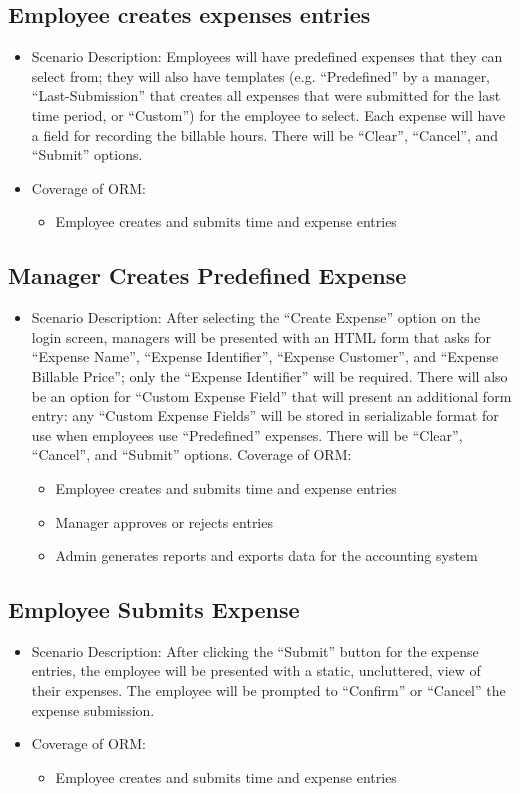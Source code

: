 \documentclass[12pt]{article}
\begin{document}
\subsection{ Employee creates expenses entries}
\begin{itemize}
\item Scenario Description: Employees will have predefined expenses that they can select from; they will also have templates (e.g. “Predefined” by a manager, “Last-Submission” that creates all expenses that were submitted for the last time period, or “Custom”) for the employee to select. Each expense will have a field for recording the billable hours. There will be “Clear”, “Cancel”, and “Submit” options.
\item Coverage of ORM:
\begin{itemize}
\item Employee creates and submits time and expense entries
\end{itemize}
\end{itemize}

\subsection{ Manager Creates Predefined Expense}
\begin{itemize}
\item Scenario Description: After selecting the “Create Expense” option on the login screen, managers will be presented with an HTML form that asks for “Expense Name”, “Expense Identifier”, “Expense Customer”, and “Expense Billable Price”; only the “Expense Identifier” will be required. There will also be an option for “Custom Expense Field” that will present an additional form entry: any “Custom Expense Fields” will be stored in serializable format for use when employees use “Predefined” expenses. There will be “Clear”, “Cancel”, and “Submit” options.
Coverage of ORM:
\begin{itemize}
\item Employee creates and submits time and expense entries
\item Manager approves or rejects entries
\item Admin generates reports and exports data for the accounting system
\end{itemize}
\end{itemize}

\subsection{ Employee Submits Expense}
\begin{itemize}
\item Scenario Description: After clicking the “Submit” button for the expense entries, the employee will be presented with a static, uncluttered, view of their expenses. The employee will be prompted to “Confirm” or “Cancel” the expense submission.
\item Coverage of ORM:
\begin{itemize}
\item Employee creates and submits time and expense entries
\end{itemize}
\end{itemize}
\end{document}
